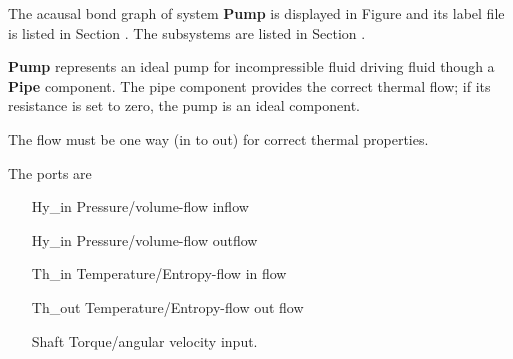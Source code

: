

   The acausal bond graph of system \textbf{Pump} is
   displayed in Figure  and its label
   file is listed in Section .
   The subsystems are listed in Section .

\textbf{Pump} represents an ideal pump for incompressible fluid
driving fluid though a \textbf{Pipe} component. The pipe component
provides the correct thermal flow; if its resistance is set to zero,
the pump is an ideal component.

The flow must be one way (in to out) for correct thermal properties.

The ports are 
\begin{itemize}
\item [Hy_in] Pressure/volume-flow inflow
\item [Hy_in] Pressure/volume-flow outflow
\item [Th_in] Temperature/Entropy-flow in flow
\item [Th_out] Temperature/Entropy-flow out flow
\item [Shaft] Torque/angular velocity input.
\end{itemize}

